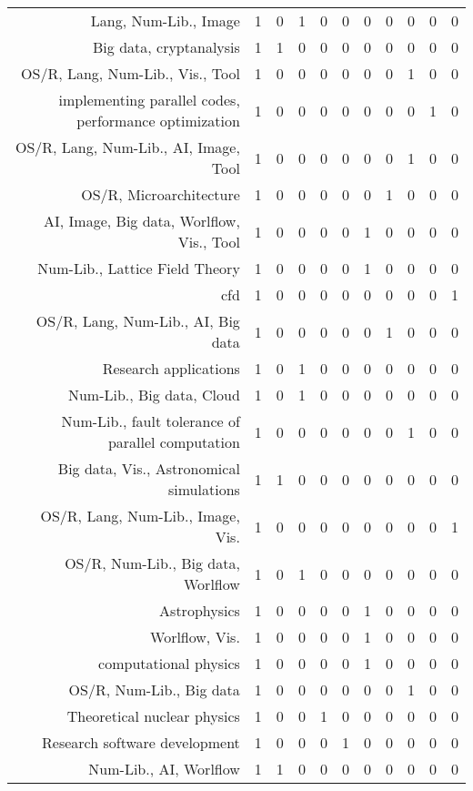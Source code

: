 {\begin{landscape}
\begin{longtable}[htb]{r|c|c|c|c|c|c|c|c|c|c}
{Lang, Num-Lib., Image} & 1 & 0 & 1 & 0 & 0 & 0 & 0 & 0 & 0 & 0 \\%
{Big data, cryptanalysis} & 1 & 1 & 0 & 0 & 0 & 0 & 0 & 0 & 0 & 0 \\%
{OS/R, Lang, Num-Lib., Vis., Tool} & 1 & 0 & 0 & 0 & 0 & 0 & 0 & 1 & 0 & 0 \\%
{implementing parallel codes, performance optimization} & 1 & 0 & 0 & 0 & 0 & 0 & 0 & 0 & 1 & 0 \\%
{OS/R, Lang, Num-Lib., AI, Image, Tool} & 1 & 0 & 0 & 0 & 0 & 0 & 0 & 1 & 0 & 0 \\%
{OS/R, Microarchitecture} & 1 & 0 & 0 & 0 & 0 & 0 & 1 & 0 & 0 & 0 \\%
{AI, Image, Big data, Worlflow, Vis., Tool} & 1 & 0 & 0 & 0 & 0 & 1 & 0 & 0 & 0 & 0 \\%
{Num-Lib., Lattice Field Theory} & 1 & 0 & 0 & 0 & 0 & 1 & 0 & 0 & 0 & 0 \\%
{cfd} & 1 & 0 & 0 & 0 & 0 & 0 & 0 & 0 & 0 & 1 \\%
{OS/R, Lang, Num-Lib., AI, Big data} & 1 & 0 & 0 & 0 & 0 & 0 & 1 & 0 & 0 & 0 \\%
{Research applications} & 1 & 0 & 1 & 0 & 0 & 0 & 0 & 0 & 0 & 0 \\%
{Num-Lib., Big data, Cloud} & 1 & 0 & 1 & 0 & 0 & 0 & 0 & 0 & 0 & 0 \\%
{Num-Lib., fault tolerance of parallel computation} & 1 & 0 & 0 & 0 & 0 & 0 & 0 & 1 & 0 & 0 \\%
{Big data, Vis., Astronomical simulations} & 1 & 1 & 0 & 0 & 0 & 0 & 0 & 0 & 0 & 0 \\%
{OS/R, Lang, Num-Lib., Image, Vis.} & 1 & 0 & 0 & 0 & 0 & 0 & 0 & 0 & 0 & 1 \\%
{OS/R, Num-Lib., Big data, Worlflow} & 1 & 0 & 1 & 0 & 0 & 0 & 0 & 0 & 0 & 0 \\%
{Astrophysics} & 1 & 0 & 0 & 0 & 0 & 1 & 0 & 0 & 0 & 0 \\%
{Worlflow, Vis.} & 1 & 0 & 0 & 0 & 0 & 1 & 0 & 0 & 0 & 0 \\%
{computational physics} & 1 & 0 & 0 & 0 & 0 & 1 & 0 & 0 & 0 & 0 \\%
{OS/R, Num-Lib., Big data} & 1 & 0 & 0 & 0 & 0 & 0 & 0 & 1 & 0 & 0 \\%
{Theoretical nuclear physics} & 1 & 0 & 0 & 1 & 0 & 0 & 0 & 0 & 0 & 0 \\%
{Research software development} & 1 & 0 & 0 & 0 & 1 & 0 & 0 & 0 & 0 & 0 \\%
{Num-Lib., AI, Worlflow} & 1 & 1 & 0 & 0 & 0 & 0 & 0 & 0 & 0 & 0 \\%

\end{longtable}
\end{landscape}}
